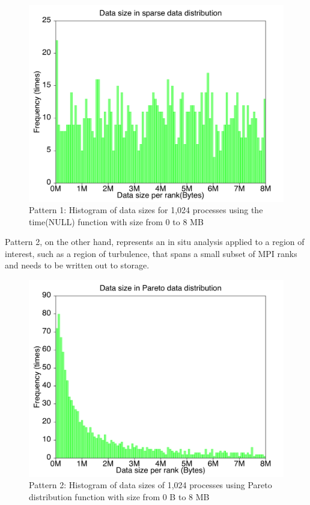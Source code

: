 \documentclass[final,5p,times]{elsarticle}
\begin{document}
\begin{figure}[!htb]
\vspace{-0.2in}
\centering
\includegraphics[scale=0.3]{uniform.pdf}
\caption{Pattern 1: Histogram of data sizes for 1,024 processes using the time(NULL) function with size from 0 to 8 MB}
\label{fig:uniform}
\vspace{-0.1in}
\end{figure}

Pattern 2, on the other hand, represents an in situ analysis applied to a region of interest, such as a  region of turbulence, that spans a small subset of MPI ranks and needs to be written out to storage.

\begin{figure}[!htb]
\vspace{-0.1in}
\centering
\includegraphics[scale=0.3]{pareto.pdf}
\vspace{-0.1in}
\caption{Pattern 2: Histogram of data sizes of 1,024 processes using Pareto distribution function with size from 0 B to 8 MB}
\label{fig:pareto}
\vspace{-0.1in}
\end{figure}
\end{document}
